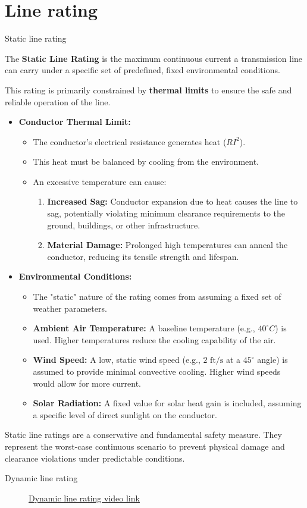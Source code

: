\section{Line rating}\label{sec:LR}
\begin{frame}[allowframebreaks]{Static line rating}

The \textbf{Static Line Rating} is the maximum continuous current a transmission line can carry under a specific set of predefined, fixed environmental conditions.

This rating is primarily constrained by \textbf{thermal limits} to ensure the safe and reliable operation of the line.

\begin{itemize}
\item \textbf{Conductor Thermal Limit:}
\begin{itemize}
\item The conductor's electrical resistance generates heat ($RI^2$).
\item This heat must be balanced by cooling from the environment.
\item An excessive temperature can cause:
\begin{enumerate}
\item \textbf{Increased Sag:} Conductor expansion due to heat causes the line to sag, potentially violating minimum clearance requirements to the ground, buildings, or other infrastructure.
\item \textbf{Material Damage:} Prolonged high temperatures can anneal the conductor, reducing its tensile strength and lifespan.
\end{enumerate}
\end{itemize}

\item \textbf{Environmental Conditions:}
\begin{itemize}
    \item The "static" nature of the rating comes from assuming a fixed set of weather parameters.
    \item \textbf{Ambient Air Temperature:} A baseline temperature (e.g., $40^{\circ}C$) is used. Higher temperatures reduce the cooling capability of the air.
    \item \textbf{Wind Speed:} A low, static wind speed (e.g., $2 \text{ ft/s}$ at a $45^{\circ}$ angle) is assumed to provide minimal convective cooling. Higher wind speeds would allow for more current.
    \item \textbf{Solar Radiation:} A fixed value for solar heat gain is included, assuming a specific level of direct sunlight on the conductor.
\end{itemize}

\end{itemize}

Static line ratings are a conservative and fundamental safety measure. They represent the worst-case continuous scenario to prevent physical damage and clearance violations under predictable conditions.


\end{frame}
\begin{frame}{Dynamic line rating}
    \begin{figure}
        \centering
        \href{https://www.youtube.com/embed/pzYvDuvM5JY}{{\underline{Dynamic line rating video link}}}
    \end{figure}
\end{frame}
